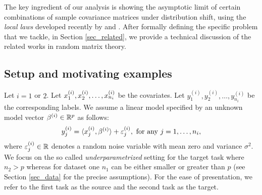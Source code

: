 The key ingredient of our analysis is showing the asymptotic limit of certain combinations of sample covariance matrices under distribution shift, using the \textit{local laws} developed recently by \citet{isotropic} and \citet{BES_free1}.
After formally defining the specific problem that we tackle, in Section \ref{sec_related}, we provide a technical discussion of the related works in random matrix theory.


\subsection{Setup and motivating examples}\label{sec_mot}

Let $i = 1$ or $2$.
Let $x_1^{(i)}, x_2^{\ss (i)}, \dots, x_{n_i}^{(i)}$ be the covariates.
Let $y_1^{(i)}, y_2^{(i)}, \dots, y_{n_i}^{(i)}$ be the corresponding labels.
We assume a linear model specified by an unknown model vector $\beta^{(i)} \in \real^p$ as follows:
\begin{align}
    y_j^{(i)} = \inner{x_j^{(i)}}{\beta^{(i)}} + \varepsilon_j^{(i)}, \text{ for any } j = 1,\dots,n_i, \label{eq_linear}
\end{align}
where $\varepsilon^{(i)}_j\in\real$ denotes a random noise variable with mean zero and variance $\sigma^2$.
We focus on the so called \textit{underparametrized} setting for the target task where $n_2 > p$ whereas for dataset one $n_1$ can be either smaller or greater than $p$  (see Section \ref{sec_data} for the precise assumptions).
For the ease of presentation, we refer to the first task as the source and the second task as the target.

